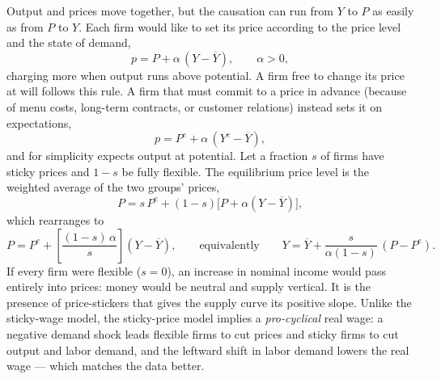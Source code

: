 Output and prices move together, but the causation can run from $Y$ to $P$ as easily as from $P$ to $Y$. Each firm would like to set its price according to the price level and the state of demand,
\[
p = P + \alpha\,(Y - \overline{Y}), \qquad \alpha>0,
\]
charging more when output runs above potential. A firm free to change its price at will follows this rule. A firm that must commit to a price in advance (because of menu costs, long-term contracts, or customer relations) instead sets it on expectations,
\[
p = P^{e} + \alpha\,(Y^{e} - \overline{Y}),
\]
and for simplicity expects output at potential. Let a fraction $s$ of firms have sticky prices and $1-s$ be fully flexible. The equilibrium price level is the weighted average of the two groups' prices,
\[
P = s\,P^{e} + (1-s)\big[P + \alpha(Y-\overline{Y})\big],
\]
which rearranges to
\[
P = P^{e} + \left[\frac{(1-s)\,\alpha}{s}\right](Y-\overline{Y}),
\qquad\text{equivalently}\qquad
Y = \overline{Y} + \frac{s}{\alpha(1-s)}\,(P-P^{e}).
\]
If every firm were flexible ($s=0$), an increase in nominal income would pass entirely into prices: money would be neutral and supply vertical. It is the presence of price-stickers that gives the supply curve its positive slope. Unlike the sticky-wage model, the sticky-price model implies a \emph{pro-cyclical} real wage: a negative demand shock leads flexible firms to cut prices and sticky firms to cut output and labor demand, and the leftward shift in labor demand lowers the real wage --- which matches the data better.
